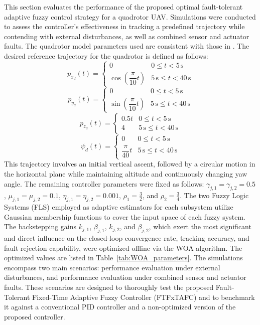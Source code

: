 This section evaluates the performance of the proposed optimal fault-tolerant adaptive
fuzzy control strategy for a quadrotor UAV. Simulations were conducted to assess the
controller's effectiveness in tracking a predefined trajectory while contending with
external disturbances, as well as combined sensor and actuator faults. The quadrotor
model parameters used are consistent with those in \cite{passive1}. The desired
reference trajectory for the quadrotor is defined as follows:
\begin{equation}
    p_{x_d}(t) =
    \begin{cases}
        0 & 0 \leq t < 5\,\text{s} \\
        \cos\!\left(\dfrac{\pi}{10}t\right) & 5\,\text{s} \leq t < 40\,\text{s}
    \end{cases}
\end{equation}
\begin{equation}
    p_{y_d}(t) =
    \begin{cases}
        0 & 0 \leq t < 5\,\text{s} \\
        \sin\!\left(\dfrac{\pi}{10}t\right) & 5\,\text{s} \leq t < 40\,\text{s}
    \end{cases}
\end{equation}
\begin{equation}
    p_{z_d}(t) =
    \begin{cases}
        0.5t & 0 \leq t < 5\,\text{s} \\
        4    & 5\,\text{s} \leq t < 40\,\text{s}
    \end{cases}
\end{equation}
\begin{equation}
    \psi_d(t) =
    \begin{cases}
        0 & 0 \leq t < 5\,\text{s} \\
        \dfrac{\pi}{40}t & 5\,\text{s} \leq t < 40\,\text{s}
    \end{cases}
\end{equation}
This trajectory involves an initial vertical ascent, followed by a circular motion
in the horizontal plane while maintaining altitude and continuously changing yaw angle.
The remaining controller parameters were fixed as follows: $\gamma_{j,1} = \gamma_{j,2} = 0.5$,
$\mu_{j,1} = \mu_{j,2} = 0.1$, $\eta_{j,1} = \eta_{j,2} = 0.001$, $\rho_1 = \tfrac{3}{2}$,
and $\rho_2 = \tfrac{3}{4}$. The two Fuzzy Logic Systems (FLS) employed as adaptive
estimators for each subsystem utilize Gaussian membership functions to cover the
input space of each fuzzy system. The backstepping gains $k_{j,1}$, $\beta_{j,1}$,
$k_{j,2}$, and $\beta_{j,2}$, which exert the most significant and direct influence on
the closed-loop convergence rate, tracking accuracy, and fault rejection capability,
were optimized offline via the WOA algorithm. The optimized values are listed in
Table~\ref{tab:WOA_parameters}. The simulations encompass two main scenarios: performance
evaluation under external disturbances, and performance evaluation under combined
sensor and actuator faults. These scenarios are designed to thoroughly test the proposed
Fault-Tolerant Fixed-Time Adaptive Fuzzy Controller (FTFxTAFC) and to benchmark
it against a conventional PID controller and a non-optimized version of the proposed
controller.

